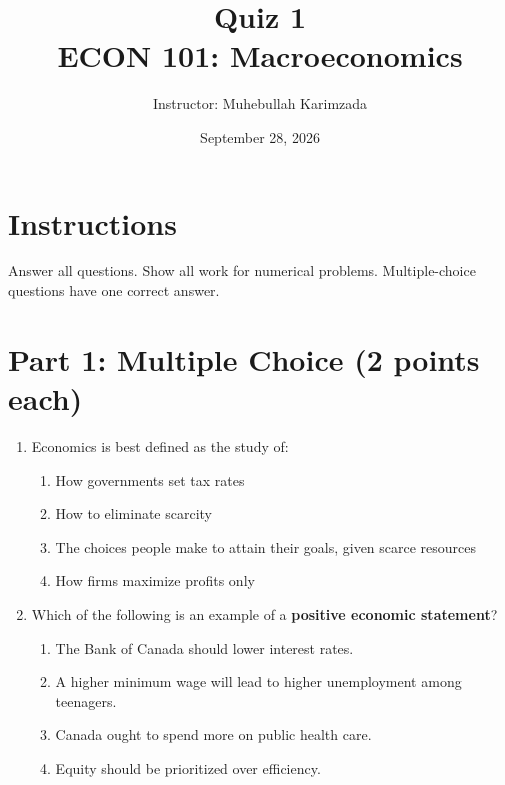 \documentclass[12pt]{article}
\title{\textbf{Quiz 1} \vspace{ 0.4cm }\\ECON 101: Macroeconomics }
\author{Instructor: Muhebullah Karimzada}
\date{September 28,  2026}
\begin{document}
\maketitle

\section*{Instructions}
Answer all questions. Show all work for numerical problems. Multiple-choice questions have one correct answer.

\section*{Part 1: Multiple Choice (2 points each)}

\begin{enumerate}
    \item Economics is best defined as the study of:
    \begin{enumerate}[label=\Alph*.]
        \item How governments set tax rates  
        \item How to eliminate scarcity  
        \item The choices people make to attain their goals, given scarce resources  
        \item How firms maximize profits only  
    \end{enumerate}

    \item Which of the following is an example of a \textbf{positive economic statement}?  
    \begin{enumerate}[label=\Alph*.]
        \item The Bank of Canada should lower interest rates.  
        \item A higher minimum wage will lead to higher unemployment among teenagers.  
        \item Canada ought to spend more on public health care.  
        \item Equity should be prioritized over efficiency.  
    \end{enumerate}


\end{enumerate}
\end{document}
